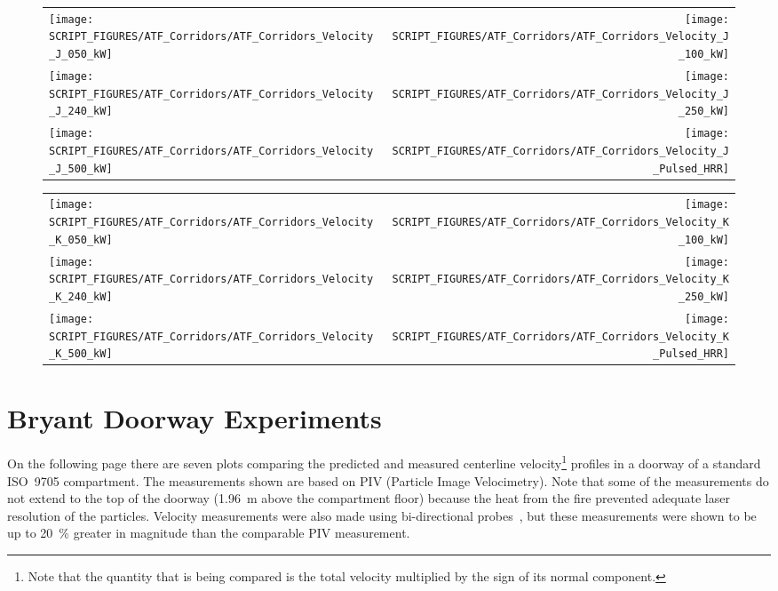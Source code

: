 \begin{figure}[p]
\begin{tabular*}{\textwidth}{l@{\extracolsep{\fill}}r}
\texttt{[image: SCRIPT\_FIGURES/ATF\_Corridors/ATF\_Corridors\_Velocity\_J\_050\_kW]} &
\texttt{[image: SCRIPT\_FIGURES/ATF\_Corridors/ATF\_Corridors\_Velocity\_J\_100\_kW]} \\
\texttt{[image: SCRIPT\_FIGURES/ATF\_Corridors/ATF\_Corridors\_Velocity\_J\_240\_kW]} &
\texttt{[image: SCRIPT\_FIGURES/ATF\_Corridors/ATF\_Corridors\_Velocity\_J\_250\_kW]} \\
\texttt{[image: SCRIPT\_FIGURES/ATF\_Corridors/ATF\_Corridors\_Velocity\_J\_500\_kW]} &
\texttt{[image: SCRIPT\_FIGURES/ATF\_Corridors/ATF\_Corridors\_Velocity\_J\_Pulsed\_HRR]}
\end{tabular*}
\label{ATF_Velocity_J}
\end{figure}

\begin{figure}[p]
\begin{tabular*}{\textwidth}{l@{\extracolsep{\fill}}r}
\texttt{[image: SCRIPT\_FIGURES/ATF\_Corridors/ATF\_Corridors\_Velocity\_K\_050\_kW]} &
\texttt{[image: SCRIPT\_FIGURES/ATF\_Corridors/ATF\_Corridors\_Velocity\_K\_100\_kW]} \\
\texttt{[image: SCRIPT\_FIGURES/ATF\_Corridors/ATF\_Corridors\_Velocity\_K\_240\_kW]} &
\texttt{[image: SCRIPT\_FIGURES/ATF\_Corridors/ATF\_Corridors\_Velocity\_K\_250\_kW]} \\
\texttt{[image: SCRIPT\_FIGURES/ATF\_Corridors/ATF\_Corridors\_Velocity\_K\_500\_kW]} &
\texttt{[image: SCRIPT\_FIGURES/ATF\_Corridors/ATF\_Corridors\_Velocity\_K\_Pulsed\_HRR]}
\end{tabular*}
\label{ATF_Velocity_K}
\end{figure}


\clearpage


\section{Bryant Doorway Experiments}

On the following page there are seven plots comparing the predicted and measured centerline velocity\footnote{Note that the quantity that is being compared is the total velocity multiplied by the sign of its normal component.} profiles in a doorway of a standard ISO~9705 compartment. The measurements shown are based on PIV (Particle Image Velocimetry). Note that some of the measurements do not extend to the top of the doorway (1.96~m above the compartment floor) because the heat from the fire prevented adequate laser resolution of the particles. Velocity measurements were also made using bi-directional probes~\cite{Bryant:FSJ2009}, but these measurements were shown to be up to 20~\% greater in magnitude than the comparable PIV measurement.



